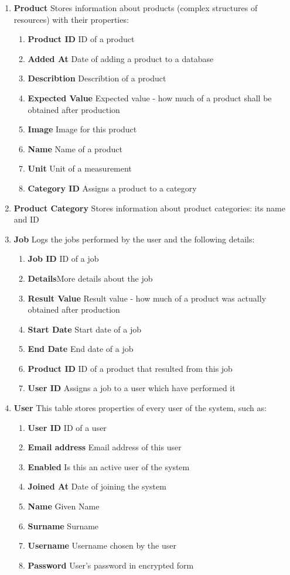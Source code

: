 \documentclass[a4paper,11pt,twoside]{report}
\theoremstyle{definition}
\begin{document}
\begin{enumerate}
\item \textbf{Product} Stores information about products (complex structures of resources) with their properties:
\begin{enumerate}
\item \textbf{Product ID} ID of a product
\item \textbf{Added At} Date of adding a product to a database
\item \textbf{Describtion} Describtion of a product
\item \textbf{Expected Value} Expected value - how much of a product shall be obtained after production
\item \textbf{Image} Image for this product
\item \textbf{Name} Name of a product
\item \textbf{Unit} Unit of a measurement
\item \textbf{Category ID} Assigns a product to a category
\end{enumerate}

\item \textbf{Product Category} Stores information about product categories: its name and ID

\item \textbf{Job} Logs the jobs performed by the user and the following details:
\begin{enumerate}
\item \textbf{Job ID} ID of a job
\item \textbf{Details}More details about the job
\item \textbf{Result Value} Result value - how much of a product was actually obtained after production
\item \textbf{Start Date} Start date of a job
\item \textbf{End Date} End date of a job
\item \textbf{Product ID} ID of a product that resulted from this job
\item \textbf{User ID} Assigns a job to a user which have performed it
\end{enumerate}

\item \textbf{User}  This table stores properties of every user of the system, such as:
\begin{enumerate}
\item \textbf{User ID} ID of a user
\item \textbf{Email address} Email address of this user
\item \textbf{Enabled} Is this an active user of the system
\item \textbf{Joined At} Date of joining the system
\item \textbf{Name} Given Name
\item \textbf{Surname} Surname
\item \textbf{Username} Username chosen by the user
\item \textbf{Password} User's password in encrypted form
\end{enumerate}


\end{enumerate}
\end{document}

